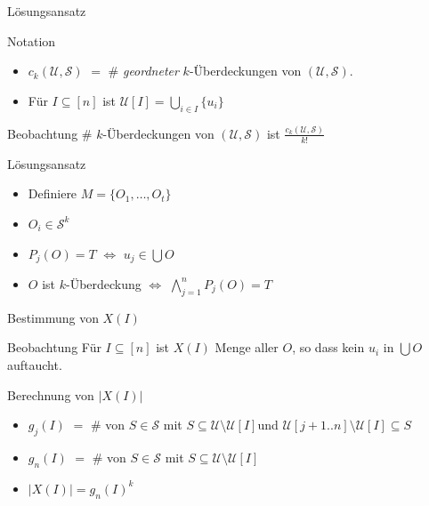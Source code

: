 \documentclass[table,german,10pt]{beamer}
\begin{document}
\begin{frame}{Lösungsansatz}
  \begin{block}{Notation}
    \begin{itemize}[<+->]
    \item $c_{k}(\mathcal{U},\mathcal{S})$ $=$ \# \emph{geordneter}
      $k$-Überdeckungen von $(\mathcal{U},\mathcal{S})$.
    \item Für $I\subseteq [n]$ ist $\mathcal{U}[I]=\bigcup_{i\in I}\{u_{i}\}$
    \end{itemize}
  \end{block}
  \pause
  \begin{block}{Beobachtung}
    \# $k$-Überdeckungen von $(\mathcal{U},\mathcal{S})$ ist
    $\frac{c_{k}(\mathcal{U},\mathcal{S})}{k!}$ 
  \end{block}
\end{frame}
\begin{frame}{Lösungsansatz}
  \begin{itemize}[<+->]
  \item Definiere $M=\{O_{1},\ldots,O_{t}\}$
  \item $O_{i}\in \mathcal{S}^{k}$
  \item $P_{j}(O)=T$ $\Leftrightarrow$ $u_{j}\in \bigcup O$
  \item $O$ ist $k$-Überdeckung $\Leftrightarrow$ $\bigwedge_{j=1}^{n}P_{j}(O)=T$
  \end{itemize}
\end{frame}
\begin{frame}{Bestimmung von $X(I)$}
  \begin{block}{Beobachtung}
    Für $I\subseteq [n]$ ist $X(I)$ Menge aller $O$, so dass kein
    $u_{i}$ in $\bigcup O$ auftaucht.
  \end{block}
  \pause
  \begin{block}{Berechnung von $|X(I)|$}
    \begin{itemize}[<+->]
    \item $g_{j}(I)$ $=$ \# von $S\in \mathcal{S}$ mit $S\subseteq
      \mathcal{U}\setminus \mathcal{U}[I]$und
      $\mathcal{U}[j+1..n]\setminus \mathcal{U}[I] \subseteq S$
    \item $g_{n}(I)$ $=$ \# von $S\in \mathcal{S}$ mit $S\subseteq
      \mathcal{U}\setminus \mathcal{U}[I]$
    \item $|X(I)|=g_{n}(I)^{k}$
    \end{itemize}
  \end{block}
\end{frame}
\end{document}
